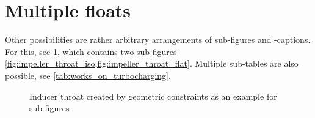 \section{Multiple floats}
Other possibilities are rather arbitrary arrangements of sub-figures and -captions.
For this, see \cref{fig:impeller_throat}, which contains two sub-figures \cref{fig:impeller_throat_iso,fig:impeller_throat_flat}.
Multiple sub-tables are also possible, see \cref{tab:works_on_turbocharging}.
\begin{figure}
%
{%
	\caption[Impeller Throat]%
	{%
		Inducer throat created by geometric constraints as an example for sub-figures%
	}%
	\label{fig:impeller_throat}%
}%
\end{figure}
